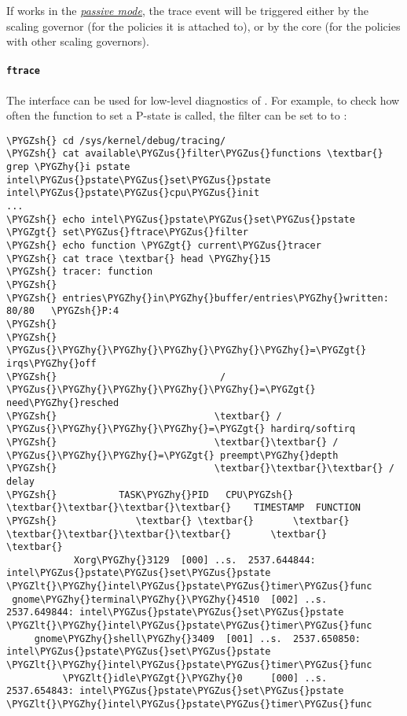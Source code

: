\documentclass[a4paper,8pt,english]{sphinxmanual}
\def\PYGZus{\char`\_}
\def\PYGZlt{\char`\<}
\def\PYGZgt{\char`\>}
\def\PYGZsh{\char`\#}
\def\PYGZhy{\char`\-}
\begin{document}
If  works in the {\hyperref[admin\string-guide/pm/intel_pstate:passive\string-mode]{\emph{passive mode}}}\label{admin-guide/pm/intel_pstate:passive-mode}, the
 trace event will be triggered either by the 
scaling governor (for the policies it is attached to), or by the 
core (for the policies with other scaling governors).


\paragraph{\texttt{ftrace}}
\label{admin-guide/pm/intel_pstate:ftrace}
The  interface can be used for low-level diagnostics of
.  For example, to check how often the function to set a
P-state is called, the  filter can be set to to
:

\begin{Verbatim}[commandchars=\\\{\}]
\PYGZsh{} cd /sys/kernel/debug/tracing/
\PYGZsh{} cat available\PYGZus{}filter\PYGZus{}functions \textbar{} grep \PYGZhy{}i pstate
intel\PYGZus{}pstate\PYGZus{}set\PYGZus{}pstate
intel\PYGZus{}pstate\PYGZus{}cpu\PYGZus{}init
...
\PYGZsh{} echo intel\PYGZus{}pstate\PYGZus{}set\PYGZus{}pstate \PYGZgt{} set\PYGZus{}ftrace\PYGZus{}filter
\PYGZsh{} echo function \PYGZgt{} current\PYGZus{}tracer
\PYGZsh{} cat trace \textbar{} head \PYGZhy{}15
\PYGZsh{} tracer: function
\PYGZsh{}
\PYGZsh{} entries\PYGZhy{}in\PYGZhy{}buffer/entries\PYGZhy{}written: 80/80   \PYGZsh{}P:4
\PYGZsh{}
\PYGZsh{}                              \PYGZus{}\PYGZhy{}\PYGZhy{}\PYGZhy{}\PYGZhy{}\PYGZhy{}=\PYGZgt{} irqs\PYGZhy{}off
\PYGZsh{}                             / \PYGZus{}\PYGZhy{}\PYGZhy{}\PYGZhy{}\PYGZhy{}=\PYGZgt{} need\PYGZhy{}resched
\PYGZsh{}                            \textbar{} / \PYGZus{}\PYGZhy{}\PYGZhy{}\PYGZhy{}=\PYGZgt{} hardirq/softirq
\PYGZsh{}                            \textbar{}\textbar{} / \PYGZus{}\PYGZhy{}\PYGZhy{}=\PYGZgt{} preempt\PYGZhy{}depth
\PYGZsh{}                            \textbar{}\textbar{}\textbar{} /     delay
\PYGZsh{}           TASK\PYGZhy{}PID   CPU\PYGZsh{}  \textbar{}\textbar{}\textbar{}\textbar{}    TIMESTAMP  FUNCTION
\PYGZsh{}              \textbar{} \textbar{}       \textbar{}   \textbar{}\textbar{}\textbar{}\textbar{}       \textbar{}         \textbar{}
            Xorg\PYGZhy{}3129  [000] ..s.  2537.644844: intel\PYGZus{}pstate\PYGZus{}set\PYGZus{}pstate \PYGZlt{}\PYGZhy{}intel\PYGZus{}pstate\PYGZus{}timer\PYGZus{}func
 gnome\PYGZhy{}terminal\PYGZhy{}\PYGZhy{}4510  [002] ..s.  2537.649844: intel\PYGZus{}pstate\PYGZus{}set\PYGZus{}pstate \PYGZlt{}\PYGZhy{}intel\PYGZus{}pstate\PYGZus{}timer\PYGZus{}func
     gnome\PYGZhy{}shell\PYGZhy{}3409  [001] ..s.  2537.650850: intel\PYGZus{}pstate\PYGZus{}set\PYGZus{}pstate \PYGZlt{}\PYGZhy{}intel\PYGZus{}pstate\PYGZus{}timer\PYGZus{}func
          \PYGZlt{}idle\PYGZgt{}\PYGZhy{}0     [000] ..s.  2537.654843: intel\PYGZus{}pstate\PYGZus{}set\PYGZus{}pstate \PYGZlt{}\PYGZhy{}intel\PYGZus{}pstate\PYGZus{}timer\PYGZus{}func
\end{Verbatim}
\end{document}
